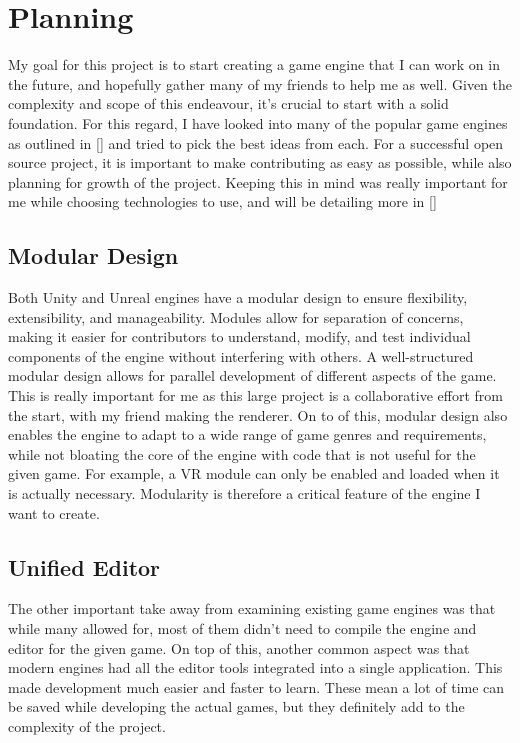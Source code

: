 \chapter{Planning}\label{chapter:planning}



My goal for this project is to start creating a game engine that I can work on in the future, and hopefully gather many of my friends to help me as well. 
Given the complexity and scope of this endeavour, it's crucial to start with a solid foundation.
For this regard, I have looked into many of the popular game engines as outlined in \autoref{} and tried to pick the best ideas from each. 
For a successful open source project, it is important to make contributing as easy as possible, while also planning for growth of the project. Keeping this in mind was really important for me while choosing technologies to use, and will be detailing more in \autoref{}

\section{Modular Design}

Both Unity and Unreal engines have a modular design to ensure flexibility, extensibility, and manageability. Modules allow for separation of concerns, making it easier for contributors to understand, modify, and test individual components of the engine without interfering with others. 
A well-structured modular design allows for parallel development of different aspects of the game. This is really important for me as this large project is a collaborative effort from the start, with my friend making the renderer.
On to of this, modular design also enables the engine to adapt to a wide range of game genres and requirements, while not bloating the core of the engine with code that is not useful for the given game. For example, a VR module can only be enabled and loaded when it is actually necessary. Modularity is therefore a critical feature of the engine I want to create.

\section{Unified Editor}

The other important take away from examining existing game engines was that while many allowed for, most of them didn't need to compile the engine and editor for the given game. On top of this, another common aspect was that modern engines had all the editor tools integrated into a single application. This made development much easier and faster to learn. These mean a lot of time can be saved while developing the actual games, but they definitely add to the complexity of the project.

